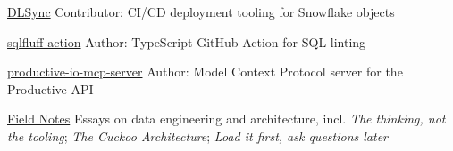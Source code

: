 


\begin{cvskillsnoncentered}

\cvskill
    {\href{https://github.com/Snowflake-Labs/dlsync}{DLSync}} %
    {Contributor: CI/CD deployment tooling for Snowflake objects}

\cvskill
    {\href{https://github.com/tetracionist/sqlfluff-action}{sqlfluff-action}} %
    {Author: TypeScript GitHub Action for SQL linting}

\cvskill
    {\href{https://github.com/tetracionist/productive-io-mcp-server}{productive-io-mcp-server}} %
    {Author: Model Context Protocol server for the Productive API}

\cvskill
    {\href{https://tetracionist.substack.com}{Field Notes}} %
    {Essays on data engineering and architecture, incl. \textit{The thinking, not the tooling}; \textit{The Cuckoo Architecture}; \textit{Load it first, ask questions later}}

\end{cvskillsnoncentered}
